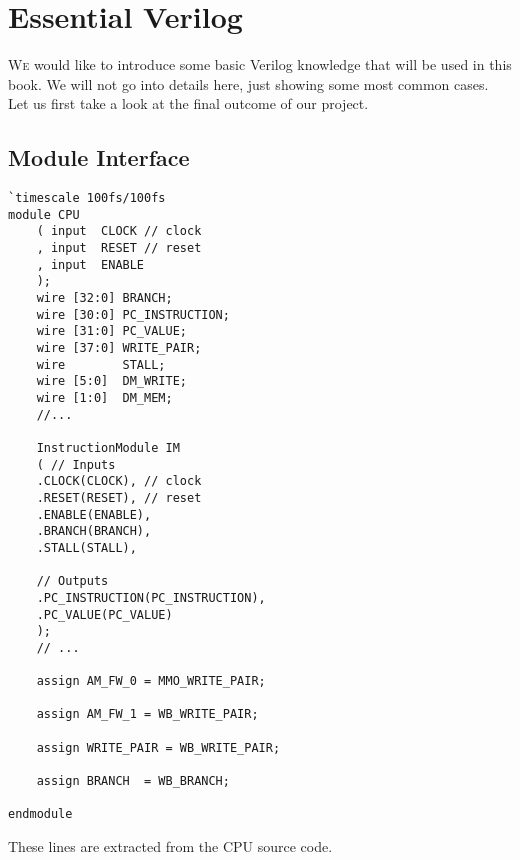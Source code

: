 \chapter{Essential Verilog}
\lettrine{W}{e} would like to introduce some basic Verilog knowledge that will be used in this book. We will not go into details here, just showing some most common cases. Let us first take a look at the final outcome of our project.
\section{Module Interface}
\begin{verbatim}
`timescale 100fs/100fs
module CPU 
    ( input  CLOCK // clock
    , input  RESET // reset
    , input  ENABLE
    );
    wire [32:0] BRANCH;
    wire [30:0] PC_INSTRUCTION;
    wire [31:0] PC_VALUE;
    wire [37:0] WRITE_PAIR;
    wire        STALL;
    wire [5:0]  DM_WRITE;
    wire [1:0]  DM_MEM;
    //...

    InstructionModule IM
    ( // Inputs
    .CLOCK(CLOCK), // clock
    .RESET(RESET), // reset
    .ENABLE(ENABLE),
    .BRANCH(BRANCH),
    .STALL(STALL),

    // Outputs
    .PC_INSTRUCTION(PC_INSTRUCTION),
    .PC_VALUE(PC_VALUE)
    );
    // ...

    assign AM_FW_0 = MMO_WRITE_PAIR;

    assign AM_FW_1 = WB_WRITE_PAIR;

    assign WRITE_PAIR = WB_WRITE_PAIR;

    assign BRANCH  = WB_BRANCH;
    
endmodule
\end{verbatim}
These lines are extracted from the CPU source code. 
